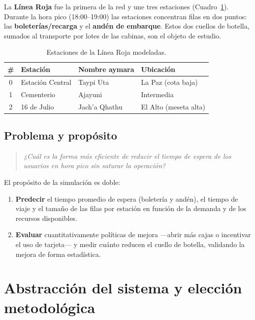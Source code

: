 \documentclass[11pt,a4paper]{article}
\begin{document}
La \textbf{Línea Roja} fue la primera de la red y une tres estaciones
(Cuadro~\ref{tab:estaciones}). Durante la hora pico (18:00--19:00) las estaciones
concentran filas en dos puntos: las \textbf{boleterías/recarga} y el \textbf{andén
de embarque}. Estos dos cuellos de botella, sumados al transporte por lotes de las
cabinas, son el objeto de estudio.

\begin{table}[h]
\centering
\caption{Estaciones de la Línea Roja modeladas.}
\label{tab:estaciones}
\begin{tabular}{clll}
\toprule
\# & Estación & Nombre aymara & Ubicación \\
\midrule
0 & Estación Central & Taypi Uta & La Paz (cota baja) \\
1 & Cementerio & Ajayuni & Intermedia \\
2 & 16 de Julio & Jach'a Qhathu & El Alto (meseta alta) \\
\bottomrule
\end{tabular}
\end{table}

\subsection{Problema y propósito}
\begin{quote}
\emph{¿Cuál es la forma más eficiente de reducir el tiempo de espera de los usuarios
en hora pico sin saturar la operación?}
\end{quote}

\noindent El propósito de la simulación es doble:
\begin{enumerate}[nosep]
  \item \textbf{Predecir} el tiempo promedio de espera (boletería y andén), el
  tiempo de viaje y el tamaño de las filas por estación en función de la demanda y
  de los recursos disponibles.
  \item \textbf{Evaluar} cuantitativamente políticas de mejora ---abrir más cajas o
  incentivar el uso de tarjeta--- y medir cuánto reducen el cuello de botella,
  validando la mejora de forma estadística.
\end{enumerate}

\section{Abstracción del sistema y elección metodológica}
\end{document}
